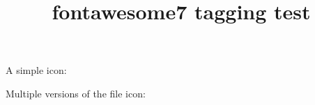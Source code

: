 \documentclass{article}
\title{fontawesome7 tagging test}
\begin{document}
A simple icon: \faHandPointUp

Multiple versions of the file icon:

\faFile

\faFile*

\faFile[regular]
\end{document}
